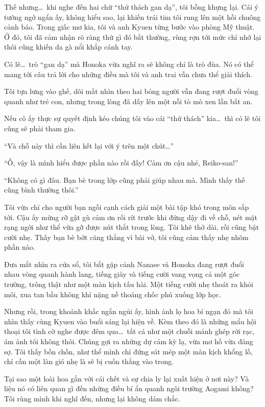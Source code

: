 \documentclass[../main.tex]{subfiles}
\begin{document}
Thế nhưng\dots\ khi nghe đến hai chữ ``thử thách gan dạ'', tôi bỗng khựng lại. Cái ý tưởng ngớ ngẩn ấy, không hiểu sao, lại khiến trái tim tôi rung lên một hồi chuông cảnh báo. Trong giấc mơ kia, tôi và anh Kyuen từng bước vào phòng Mỹ thuật. Ở đó, tôi đã cảm nhận rõ ràng thứ gì đó bất thường, rùng rợn tới mức chỉ nhớ lại thôi cũng khiến da gà nổi khắp cánh tay.

Có lẽ\dots\ trò ``gan dạ'' mà Honoka vừa nghĩ ra sẽ không chỉ là trò đùa. Nó có thể mang tới câu trả lời cho những điều mà tôi và anh trai vẫn chưa thể giải thích.

Tôi tựa lưng vào ghế, dõi mắt nhìn theo hai bóng người vẫn đang rượt đuổi vòng quanh như trẻ con, nhưng trong lòng đã dấy lên một nỗi tò mò xen lẫn bất an.

Nếu cô ấy thực sự quyết định kéo chúng tôi vào cái ``thử thách'' kia\dots\ thì có lẽ tôi cũng sẽ phải tham gia.


``Và chỗ này thì cần liên kết lại với ý trên một chút\dots''

``Ồ, vậy là mình hiểu được phần nào rồi đấy! Cảm ơn cậu nhé, Reiko-san!''

``Không có gì đâu. Bạn bè trong lớp cũng phải giúp nhau mà. Mình thấy thế cũng bình thường thôi.''

Tôi vừa chỉ cho người bạn ngồi cạnh cách giải một bài tập khó trong môn sắp tới. Cậu ấy mừng rỡ gật gù cảm ơn rối rít trước khi đứng dậy đi về chỗ, nét mặt rạng ngời như thể vừa gỡ được nút thắt trong lòng. Tôi khẽ thở dài, rồi cũng bật cười nhẹ. Thấy bạn bè bớt căng thẳng vì bài vở, tôi cũng cảm thấy nhẹ nhõm phần nào.

Đưa mắt nhìn ra cửa sổ, tôi bắt gặp cảnh Nanase và Honoka đang rượt đuổi nhau vòng quanh hành lang, tiếng giày và tiếng cười vang vọng cả một góc trường, trông thật như một màn kịch tấu hài. Một tiếng cười nhẹ thoát ra khỏi môi, xua tan bầu không khí nặng nề thoáng chốc phủ xuống lớp học.

Nhưng rồi, trong khoảnh khắc ngắn ngủi ấy, hình ảnh lọ hoa bỉ ngạn đỏ mà tôi nhìn thấy cùng Kyuen vào buổi sáng lại hiện về. Kèm theo đó là những mẩu hội thoại tôi tình cờ nghe được đêm qua\dots\ tất cả như một chuỗi mảnh ghép rời rạc, ám ảnh tôi không thôi. Chúng gợi ra những dự cảm kỳ lạ, vừa mơ hồ vừa đáng sợ. Tôi thấy bồn chồn, như thể mình chỉ đứng sát mép một màn kịch khổng lồ, chỉ cần một làn gió nhẹ là sẽ bị cuốn thẳng vào trong.

Tại sao một loài hoa gắn với cái chết và sự chia ly lại xuất hiện ở nơi này? Và liệu nó có liên quan gì đến những điều bí ẩn quanh ngôi trường Aogami không? Tôi rùng mình khi nghĩ đến, nhưng lại không dám chắc.
\end{document}
